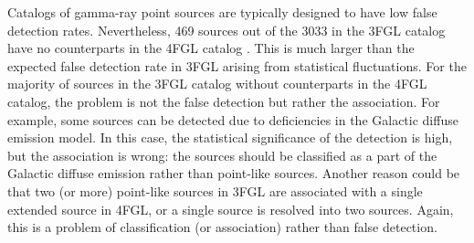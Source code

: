 \documentclass[referee]{aa} %
\begin{document}
Catalogs of gamma-ray point sources are typically designed to have low false detection rates. 
Nevertheless, 469 sources out of the 3033 in the 3FGL catalog \citep{2015ApJS..218...23A} have no counterparts 
in the 4FGL catalog \citep{2020ApJS..247...33A}.
This is much larger than the expected false detection rate in 3FGL arising from statistical fluctuations.
For the majority of sources in the 3FGL catalog without counterparts in the 4FGL catalog, the problem is not the false detection 
but rather the association.
For example, some sources can be detected due to deficiencies in the Galactic diffuse emission model.
In this case, the statistical significance of the detection is high, but the association is wrong: the sources should be classified as
a part of the Galactic diffuse emission rather than point-like sources.
Another reason could be that two (or more) point-like sources in 3FGL are associated with a single extended source in 4FGL,
or a single source is resolved into two sources.
Again, this is a problem of classification (or association) rather than false detection.
\end{document}
